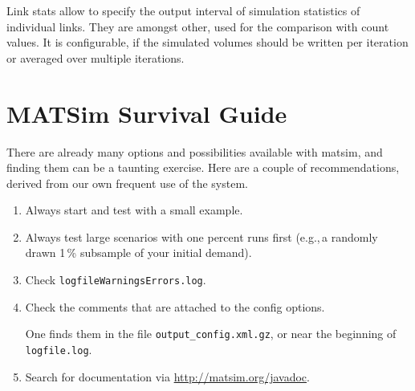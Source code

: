Link stats allow to specify the output interval of simulation statistics of individual links. They are amongst other, used for the comparison with count values. It is configurable, if the simulated volumes should be written per iteration or averaged over multiple iterations.

\section{MATSim Survival Guide}
\label{sec:survival}
There are already many options and possibilities available with \gls{matsim}, and finding them can be a taunting exercise.  Here are a couple of recommendations, derived from our own frequent use of the system.
\begin{enumerate}

\item Always start and test with a small example.

\item Always test large scenarios with one percent runs first (e.g.,\,a randomly drawn 1\,\% subsample of your initial demand).

\item Check \lstinline{logfileWarningsErrors.log}.

\item Check the comments that are attached to the config options.

One finds them in the file \lstinline{output_config.xml.gz}, or near the beginning of \lstinline{logfile.log}.

\item Search for documentation via \url{http://matsim.org/javadoc}.

\end{enumerate}


